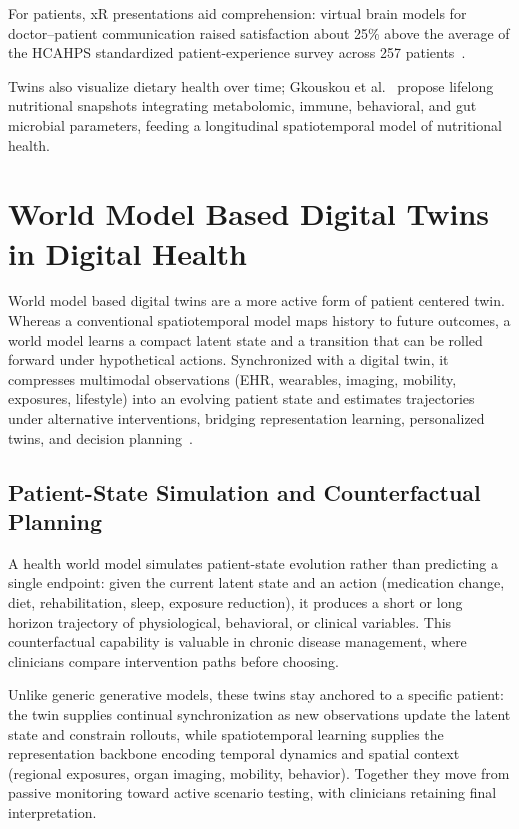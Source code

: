 \documentclass[journal]{IEEEtran}
\begin{document}
For patients, xR presentations aid comprehension: virtual brain models for doctor--patient communication raised satisfaction about 25\% above the average of the HCAHPS standardized patient-experience survey across 257 patients~\cite{Louis2021VR}.

Twins also visualize dietary health over time; Gkouskou et al.~\cite{gkouskou2020virtual} propose lifelong nutritional snapshots integrating metabolomic, immune, behavioral, and gut microbial parameters, feeding a longitudinal spatiotemporal model of nutritional health.

\section{World Model Based Digital Twins in Digital Health}
\label{sec:world_model_dt}
World model based digital twins are a more active form of patient centered twin. Whereas a conventional spatiotemporal model maps history to future outcomes, a world model learns a compact latent state and a transition that can be rolled forward under hypothetical actions. Synchronized with a digital twin, it compresses multimodal observations (EHR, wearables, imaging, mobility, exposures, lifestyle) into an evolving patient state and estimates trajectories under alternative interventions, bridging representation learning, personalized twins, and decision planning~\cite{Zheng2026DTtoWM}.

\subsection{Patient-State Simulation and Counterfactual Planning}
A health world model simulates patient-state evolution rather than predicting a single endpoint: given the current latent state and an action (medication change, diet, rehabilitation, sleep, exposure reduction), it produces a short or long horizon trajectory of physiological, behavioral, or clinical variables. This counterfactual capability is valuable in chronic disease management, where clinicians compare intervention paths before choosing.

Unlike generic generative models, these twins stay anchored to a specific patient: the twin supplies continual synchronization as new observations update the latent state and constrain rollouts, while spatiotemporal learning supplies the representation backbone encoding temporal dynamics and spatial context (regional exposures, organ imaging, mobility, behavior). Together they move from passive monitoring toward active scenario testing, with clinicians retaining final interpretation.
\end{document}
